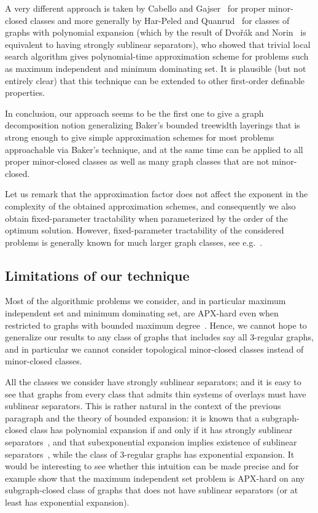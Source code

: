 \documentclass[a4paper,11pt]{article}
\begin{document}
A very different approach is taken by Cabello and Gajser~\cite{cabello2015simple} for proper minor-closed classes and more generally by
Har-Peled and Quanrud~\cite{har2015approximation} for classes of graphs with polynomial expansion (which by the
result of Dvo\v{r}\'ak and Norin~\cite{dvorak2016strongly} is equivalent to having strongly sublinear separators),
who showed that trivial local search algorithm gives polynomial-time approximation scheme for problems such as maximum
independent and minimum dominating set.  It is plausible (but not entirely clear) that this technique can be extended to
other first-order definable properties.

In conclusion, our approach seems to be the first one to give a graph decomposition notion generalizing Baker's bounded treewidth
layerings that is strong enough to give simple approximation schemes for most problems approachable via Baker's
technique, and at the same time can be applied to all proper minor-closed classes as well as many graph classes that are not minor-closed.

Let us remark that the approximation factor does not affect the exponent in the complexity of the obtained approximation schemes,
and consequently we also obtain fixed-parameter tractability when parameterized by the order of the optimum solution.
However, fixed-parameter tractability of the considered problems is generally known for much larger graph classes, see e.g.~\cite{grohe2014deciding}.

\subsection{Limitations of our technique}

Most of the algorithmic problems we consider, and in particular maximum independent set and minimum dominating set,
are APX-hard even when restricted to graphs with bounded maximum degree~\cite{papadimitriou1988optimization}.
Hence, we cannot hope to generalize our results to any class of graphs that includes say all 3-regular graphs,
and in particular we cannot consider topological minor-closed classes instead of minor-closed classes.

All the classes we consider have strongly sublinear separators; and it is easy to see that graphs from every class
that admits thin systems of overlays must have sublinear separators.  This is rather natural in the context of the
previous paragraph and the theory of bounded expansion: it is known that a subgraph-closed class has polynomial
expansion if and only if it has strongly sublinear separators~\cite{dvorak2016strongly}, and that subexponential
expansion implies existence of sublinear separators~\cite{grad2}, while the class of 3-regular graphs has
exponential expansion.  It would be interesting to see whether this intuition can be made precise and for example show
that the maximum independent set problem is APX-hard on any subgraph-closed class of graphs that does not have
sublinear separators (or at least has exponential expansion).
\end{document}
